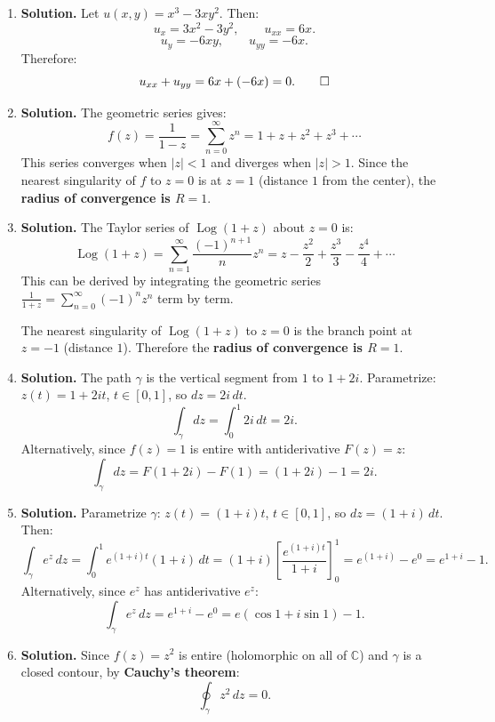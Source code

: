 \begin{enumerate}
(Note: $u = e^x \cos y = \operatorname{Re}(e^z)$, so this also follows from the fact that $e^z$ is entire.)

\item \textbf{Solution.}
Let $u(x,y) = x^3 - 3xy^2$. Then:
\[
u_x = 3x^2 - 3y^2, \qquad u_{xx} = 6x.
\]
\[
u_y = -6xy, \qquad u_{yy} = -6x.
\]
Therefore:
\[
u_{xx} + u_{yy} = 6x + (-6x) = 0. \qed
\]

\item \textbf{Solution.}
The geometric series gives:
\[
f(z) = \frac{1}{1-z} = \sum_{n=0}^{\infty} z^n = 1 + z + z^2 + z^3 + \cdots
\]
This series converges when $|z| < 1$ and diverges when $|z| > 1$. Since the nearest singularity of $f$ to $z = 0$ is at $z = 1$ (distance $1$ from the center), the \textbf{radius of convergence is $R = 1$}.

\item \textbf{Solution.}
The Taylor series of $\operatorname{Log}(1+z)$ about $z = 0$ is:
\[
\operatorname{Log}(1+z) = \sum_{n=1}^{\infty} \frac{(-1)^{n+1}}{n} z^n = z - \frac{z^2}{2} + \frac{z^3}{3} - \frac{z^4}{4} + \cdots
\]
This can be derived by integrating the geometric series $\frac{1}{1+z} = \sum_{n=0}^{\infty}(-1)^n z^n$ term by term.

The nearest singularity of $\operatorname{Log}(1+z)$ to $z = 0$ is the branch point at $z = -1$ (distance $1$). Therefore the \textbf{radius of convergence is $R = 1$}.

\item \textbf{Solution.}
The path $\gamma$ is the vertical segment from $1$ to $1 + 2i$. Parametrize: $z(t) = 1 + 2it$, $t \in [0,1]$, so $dz = 2i\,dt$.
\[
\int_\gamma dz = \int_0^1 2i\,dt = 2i.
\]
Alternatively, since $f(z) = 1$ is entire with antiderivative $F(z) = z$:
\[
\int_\gamma dz = F(1+2i) - F(1) = (1 + 2i) - 1 = 2i.
\]

\item \textbf{Solution.}
Parametrize $\gamma$: $z(t) = (1+i)t$, $t \in [0,1]$, so $dz = (1+i)\,dt$. Then:
\[
\int_\gamma e^z\,dz = \int_0^1 e^{(1+i)t}(1+i)\,dt = (1+i)\left[\frac{e^{(1+i)t}}{1+i}\right]_0^1 = e^{(1+i)} - e^0 = e^{1+i} - 1.
\]
Alternatively, since $e^z$ has antiderivative $e^z$:
\[
\int_\gamma e^z\,dz = e^{1+i} - e^0 = e(\cos 1 + i\sin 1) - 1.
\]

\item \textbf{Solution.}
Since $f(z) = z^2$ is entire (holomorphic on all of $\mathbb{C}$) and $\gamma$ is a closed contour, by \textbf{Cauchy's theorem}:
\[
\oint_\gamma z^2\,dz = 0.
\]


\end{enumerate}
